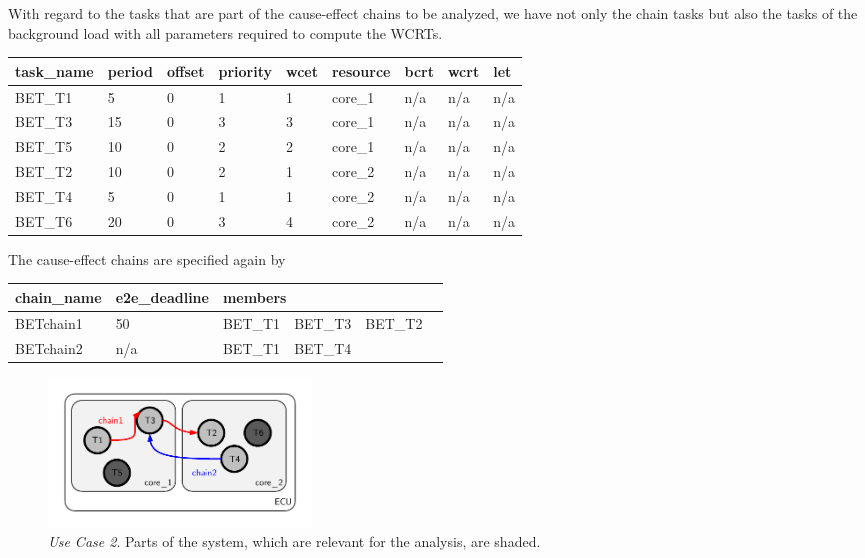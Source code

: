 With regard to the tasks that are part of the cause-effect chains to be analyzed, we have not only the chain tasks but also the tasks of the background load with all parameters required to compute the WCRTs.
\begin{center}
	\begin{tabular}{|l|l|l|l|l|l|l|l|l|} \hline
		  \textbf{task\_name}  
		& \textbf{period} 
		& \textbf{offset} 
		& \textbf{priority}
		& \textbf{wcet}
		& \textbf{resource} 
		& \textbf{bcrt}		
		& \textbf{wcrt}
		& \textbf{let} \\ \hline
			BET\_T1&5&0&1&1&core\_1&n/a&n/a&n/a \\ \hline
			BET\_T3&15&0&3&3&core\_1&n/a&n/a&n/a \\ \hline
			BET\_T5&10&0&2&2&core\_1&n/a&n/a&n/a \\ \hline
			BET\_T2&10&0&2&1&core\_2&n/a&n/a&n/a \\ \hline
			BET\_T4&5&0&1&1&core\_2&n/a&n/a&n/a \\ \hline
			BET\_T6&20&0&3&4&core\_2&n/a&n/a&n/a \\ \hline
	\end{tabular}
\end{center}

The cause-effect chains are specified again by
\begin{center}
	\begin{tabular}{|l|l|l|l|l|l|} \hline
		\textbf{chain\_name} 
		& \textbf{e2e\_deadline}
		& \multicolumn{3}{|l|}{\textbf{members}} \\ \hline
			BETchain1 & 50  & BET\_T1 & BET\_T3 & BET\_T2 \\ \hline
			BETchain2 & n/a & BET\_T1 & BET\_T4 & \\ \hline
	\end{tabular}
\end{center}
%
\begin{figure}[h!]
	\centering
		\includegraphics[height=4cm, trim = 0.5cm 0.5cm 0.5cm 0.5cm]{fig/bet2-system.pdf}
	\caption{\emph{Use Case 2}. Parts of the system, which are relevant for the analysis, are shaded.}
	\label{fig:use-case-2}
\end{figure}



